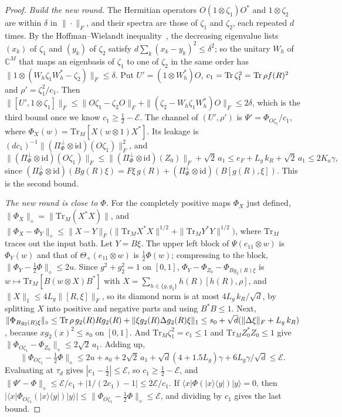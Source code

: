 \begin{proof}
\emph{Build the new round.} The Hermitian operators $O(1\otimes\zeta_1)O^*$ and $1\otimes\zeta_2$ are within $\delta$ in $\|\cdot\|_F$, and their
spectra are those of $\zeta_1$ and $\zeta_2$, each repeated $d$ times. By the Hoffman--Wielandt inequality~\cite{HoffmanWielandt1953}, the decreasing
eigenvalue lists $(x_k)$ of $\zeta_1$ and $(y_k)$ of $\zeta_2$ satisfy $d\sum_k(x_k-y_k)^2\le\delta^2$; so the unitary $W_h$ of $\mathbb C^M$ that maps
an eigenbasis of $\zeta_1$ to one of $\zeta_2$ in the same order has $\|1\otimes(W_h\zeta_1W_h^*-\zeta_2)\|_F\le\delta$. Put $U'=(1\otimes W_h^*)O$,
$c_1=\operatorname{Tr}\zeta_1^2=\operatorname{Tr}\rho f(R)^2$ and $\rho'=\zeta_1^2/c_1$. Then
$\|[U',1\otimes\zeta_1]\|_F\le\|O\zeta_1-\zeta_2O\|_F+\|(\zeta_2-W_h\zeta_1W_h^*)O\|_F\le2\delta$, which is the third bound once we know
$c_1\ge\frac12-\mathcal E$. The channel of $(U',\rho')$ is $\Psi'=\Phi_{O\zeta_1}/c_1$, where $\Phi_X(w)=\mathrm{Tr}_M[X(w\otimes1)X^*]$. Its leakage is
$(dc_1)^{-1}\|(\Pi_\Phi^\perp\otimes\mathrm{id})(O\zeta_1)\|_F^2$, and
\[
\|(\Pi_\Phi^\perp\otimes\mathrm{id})(O\zeta_1)\|_F\le\|(\Pi_\Phi^\perp\otimes\mathrm{id})(Z_0)\|_F+\sqrt2\,a_1\le e_F+L_g\,k_R+\sqrt2\,a_1\le2K_a\gamma,
\]
since $(\Pi_\Phi^\perp\otimes\mathrm{id})(Bg(R)\xi)=F\xi\,g(R)+(\Pi_\Phi^\perp\otimes\mathrm{id})(B[g(R),\xi])$. This is the second bound.

\emph{The new round is close to $\Phi$.} For the completely positive maps $\Phi_X$ just defined, $\|\Phi_X\|_\diamond=\|\mathrm{Tr}_M(X^*X)\|$, and
$\|\Phi_X-\Phi_Y\|_\diamond\le\|X-Y\|_F\bigl(\|\mathrm{Tr}_M X^*X\|^{1/2}+\|\mathrm{Tr}_M Y^*Y\|^{1/2}\bigr)$, where $\mathrm{Tr}_M$ traces out the input bath.
Let $Y=B\xi$. The upper left block of $\Psi(e_{11}\otimes w)$ is $\Phi_Y(w)$ and that of $\Theta_+(e_{11}\otimes w)$ is $\frac12\Phi(w)$; compressing to
the block, $\|\Phi_Y-\frac12\Phi\|_\diamond\le2u$. Since $g^2+g_2^2=1$ on $[0,1]$, $\Phi_Y-\Phi_{Z_0}-\Phi_{Bg_2(R)\xi}$ is
$w\mapsto\mathrm{Tr}_M[B(w\otimes X)B^*]$ with $X=\sum_{h\in\{g,g_2\}}h(R)[h(R),\rho]$, and $\|X\|_1\le4L_g\|[R,\xi]\|_F$, so its diamond norm is at most
$4L_g\,k_R/\sqrt d$, by splitting $X$ into positive and negative parts and using $B^*B\le1$. Next,
$\|\Phi_{Bg_2(R)\xi}\|_\diamond\le\operatorname{Tr}\rho\,g_2(R)Rg_2(R)+\|\xi g_2(R)\Delta g_2(R)\xi\|_1\le s_0+\sqrt d(\|\Delta\xi\|_F+L_g\,k_R)$, because $xg_2(x)^2\le s_0$ on
$[0,1]$. And $\mathrm{Tr}_M\zeta_1^2=c_1\le1$ and $\mathrm{Tr}_M Z_0^*Z_0\le1$ give $\|\Phi_{O\zeta_1}-\Phi_{Z_0}\|_\diamond\le2\sqrt2\,a_1$. Adding up,
\[
\bigl\|\Phi_{O\zeta_1}-\tfrac12\Phi\bigr\|_\diamond\le2u+s_0+2\sqrt2\,a_1+\sqrt d(4+1.5L_g)\gamma+6L_g\gamma/\sqrt d\le \mathcal E .
\]
Evaluating at $\tau_d$ gives $|c_1-\frac12|\le \mathcal E$, so $c_1\ge\frac12-\mathcal E$, and $\|\Psi'-\Phi\|_\diamond\le \mathcal E/c_1+|1/(2c_1)-1|\le2\mathcal E/c_1$. If
$\langle x|\Phi(|x\rangle\langle y|)|y\rangle=0$, then $|\langle x|\Phi_{O\zeta_1}(|x\rangle\langle y|)|y\rangle|\le\|\Phi_{O\zeta_1}-\frac12\Phi\|_\diamond\le \mathcal E$, and dividing by
$c_1$ gives the last bound.
\end{proof}

